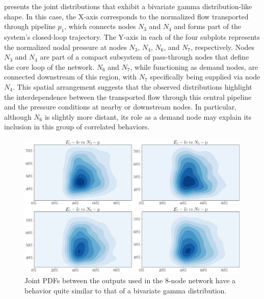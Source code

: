  presents the joint distributions that exhibit a bivariate gamma distribution-like shape. In this case, the X-axis corresponds to the normalized flow transported through pipeline $p_1$, which connects nodes $N_3$ and $N_4$ and forms part of the system’s closed-loop trajectory. The Y-axis in each of the four subplots represents the normalized nodal pressure at nodes $N_3$, $N_4$, $N_6$, and $N_7$, respectively. Nodes $N_3$ and $N_4$ are part of a compact subsystem of pass-through nodes that define the core loop of the network. $N_6$ and $N_7$, while functioning as demand nodes, are connected downstream of this region, with $N_7$ specifically being supplied via node $N_4$. This spatial arrangement suggests that the observed distributions highlight the interdependence between the transported flow through this central pipeline and the pressure conditions at nearby or downstream nodes. In particular, although $N_6$ is slightly more distant, its role as a demand node may explain its inclusion in this group of correlated behaviors.


\begin{figure}[htbp]
    \begin{center}
        \includegraphics[width=.75\textwidth]{figures/Chapter_NonLinealCensnet/outputs_outputs_1.png}
    \end{center}
    \caption{Joint PDFs between the outputs used in the 8-node network have a behavior quite similar to that of a bivariate gamma distribution.}
    \label{fig:joint_distributions_output_output_1}
\end{figure}




